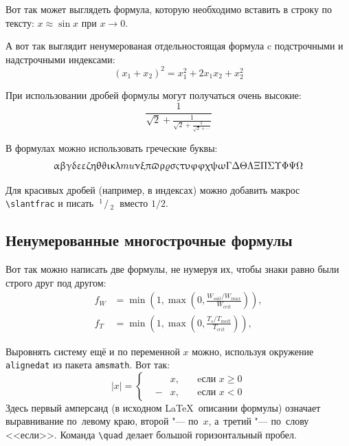 Вот так может выглядеть формула, которую необходимо вставить в строку по тексту: $x \approx \sin x$ при $x \to 0$.

А вот так выглядит ненумерованая отдельностоящая формула c подстрочными и надстрочными индексами:
\[
(x_1+x_2)^2 = x_1^2 + 2 x_1 x_2 + x_2^2
\]

При использовании дробей формулы могут получаться очень высокие:
\[
  \frac{1}{\sqrt{2}+
  \displaystyle\frac{1}{\sqrt{2}+
  \displaystyle\frac{1}{\sqrt{2}+\cdots}}}
\]

В формулах можно использовать греческие буквы:
\[
\alpha\beta\gamma\delta\epsilon\varepsilon\zeta\eta\theta\vartheta\iota\kappa\lambda\\mu\nu\xi\pi\varpi\rho\varrho\sigma\varsigma\tau\upsilon\phi\varphi\chi\psi\omega\Gamma\Delta\Theta\Lambda\Xi\Pi\Sigma\Upsilon\Phi\Psi\Omega
\]

\def\slantfrac#1#2{ \hspace{3pt}\!^{#1}\!\!\hspace{1pt}/
  \hspace{2pt}\!\!_{#2}\!\hspace{3pt}
} %
Для красивых дробей (например, в индексах) можно добавить макрос
\verb+\slantfrac+ и писать $\slantfrac{1}{2}$ вместо $1/2$.

\subsection{Ненумерованные многострочные формулы} \label{subsect1_3_2}

Вот так можно написать две формулы, не нумеруя их, чтобы знаки равно были строго друг под другом:
\begin{align}
  f_W & =  \min \left( 1, \max \left( 0, \frac{W_{soil} / W_{max}}{W_{crit}} \right)  \right), \nonumber \\
  f_T & =  \min \left( 1, \max \left( 0, \frac{T_s / T_{melt}}{T_{crit}} \right)  \right), \nonumber
\end{align}

Выровнять систему ещё и по переменной $ x $ можно, используя окружение \verb|alignedat| из пакета \verb|amsmath|. Вот так: 
\[
    |x| = \left\{
    \begin{alignedat}{2}
        &&x, \quad &\text{eсли } x\geqslant 0 \\
        &-&x, \quad & \text{eсли } x<0
    \end{alignedat}
    \right.
\]
Здесь первый амперсанд (в исходном \LaTeX\ описании формулы) означает выравнивание по~левому краю, второй "--- по~$ x $, а~третий "--- по~слову <<если>>. Команда \verb|\quad| делает большой горизонтальный пробел.

